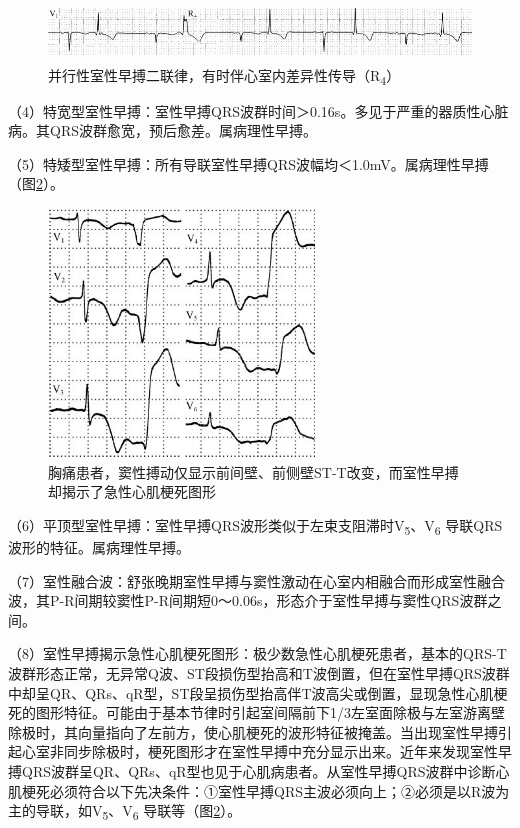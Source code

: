 \begin{figure}[!htbp]
 \centering
 \includegraphics[width=5.58333in,height=0.61458in]{./images/Image00182.jpg}
 \captionsetup{justification=centering}
 \caption{并行性室性早搏二联律，有时伴心室内差异性传导（R\textsubscript{4}）}
 \label{fig11-22}
  \end{figure} 


（4）特宽型室性早搏：室性早搏QRS波群时间＞0.16s。多见于严重的器质性心脏病。其QRS波群愈宽，预后愈差。属病理性早搏。

（5）特矮型室性早搏：所有导联室性早搏QRS波幅均＜1.0mV。属病理性早搏（图\ref{fig11-23}）。

\begin{figure}[!htbp]
 \centering
 \includegraphics[width=2.78125in,height=2.60417in]{./images/Image00183.jpg}
 \captionsetup{justification=centering}
 \caption{胸痛患者，窦性搏动仅显示前间壁、前侧壁ST-T改变，而室性早搏却揭示了急性心肌梗死图形}
 \label{fig11-23}
  \end{figure} 

（6）平顶型室性早搏：室性早搏QRS波形类似于左束支阻滞时V\textsubscript{5}、V\textsubscript{6} 导联QRS波形的特征。属病理性早搏。

（7）室性融合波：舒张晚期室性早搏与窦性激动在心室内相融合而形成室性融合波，其P-R间期较窦性P-R间期短0～0.06s，形态介于室性早搏与窦性QRS波群之间。

（8）室性早搏揭示急性心肌梗死图形：极少数急性心肌梗死患者，基本的QRS-T波群形态正常，无异常Q波、ST段损伤型抬高和T波倒置，但在室性早搏QRS波群中却呈QR、QRs、qR型，ST段呈损伤型抬高伴T波高尖或倒置，显现急性心肌梗死的图形特征。可能由于基本节律时引起室间隔前下1/3左室面除极与左室游离壁除极时，其向量指向了左前方，使心肌梗死的波形特征被掩盖。当出现室性早搏引起心室非同步除极时，梗死图形才在室性早搏中充分显示出来。近年来发现室性早搏QRS波群呈QR、QRs、qR型也见于心肌病患者。从室性早搏QRS波群中诊断心肌梗死必须符合以下先决条件：①室性早搏QRS主波必须向上；②必须是以R波为主的导联，如V\textsubscript{5}、V\textsubscript{6} 导联等（图\ref{fig11-23}）。

